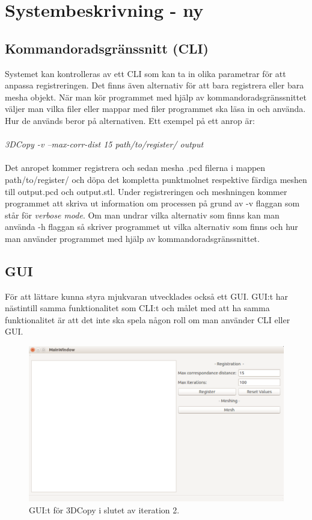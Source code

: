\section{Systembeskrivning - ny}
\subsection{Kommandoradsgränssnitt (CLI)}

Systemet kan kontrolleras av ett CLI som kan ta in olika parametrar för att anpassa registreringen. Det finns även alternativ för att bara registrera eller bara mesha objekt. När man kör programmet med hjälp av kommandoradsgränssnittet väljer man vilka filer eller mappar med filer programmet ska läsa in och använda. Hur de används beror på alternativen. Ett exempel på ett anrop är:\\\\
\textit{3DCopy -v --max-corr-dist 15 path/to/register/ output}\\\\
Det anropet kommer registrera och sedan mesha .pcd filerna i mappen path/to/register/ och döpa det kompletta punktmolnet respektive färdiga meshen till output.pcd och output.stl. Under registreringen och meshningen kommer programmet att skriva ut information om processen på grund av -v flaggan som står för \textit{verbose mode}. Om man undrar vilka alternativ som finns kan man använda -h flaggan så skriver programmet ut vilka alternativ som finns och hur man använder programmet med hjälp av kommandoradsgränssnittet. 

\subsection{GUI}
För att lättare kunna styra mjukvaran utvecklades också ett GUI. GUI:t har nästintill samma funktionalitet som CLI:t och målet med att ha samma funktionalitet är att det inte ska spela någon roll om man använder CLI eller GUI.

\begin{figure}[H]
	\centering
	\includegraphics[width=130mm]{figures/3DCopyGUI.PNG}
	\caption{GUI:t för 3DCopy i slutet av iteration 2.}
	\label{fig:3dcopy_gui}
\end{figure}

